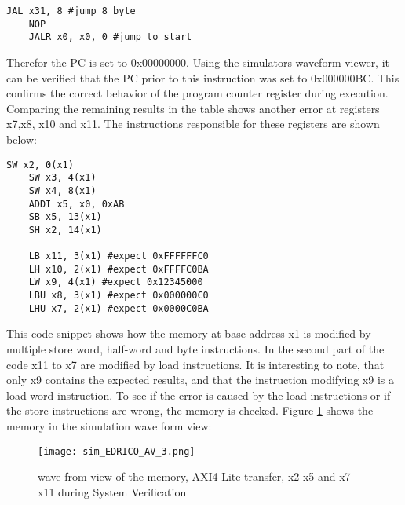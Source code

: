 \begin{lstlisting}[caption=Snippet 1 from the executed test code]
	JAL x31, 8 #jump 8 byte
	NOP
	JALR x0, x0, 0 #jump to start
\end{lstlisting}

Therefor the \ac{PC} is set to 0x00000000. Using the simulators waveform viewer, it can be verified that the \ac{PC} prior to this instruction was set to 0x000000BC. This confirms the correct behavior of the program counter register during execution.\\
Comparing the remaining results in the table shows another error at registers x7,x8, x10 and x11. The instructions responsible for these registers are shown below:

\begin{lstlisting}[caption=Snippet 2 from the executed test code]
	SW x2, 0(x1)
	SW x3, 4(x1)
	SW x4, 8(x1)
	ADDI x5, x0, 0xAB
	SB x5, 13(x1)
	SH x2, 14(x1)
	
	LB x11, 3(x1) #expect 0xFFFFFFC0
	LH x10, 2(x1) #expect 0xFFFFC0BA
	LW x9, 4(x1) #expect 0x12345000
	LBU x8, 3(x1) #expect 0x000000C0
	LHU x7, 2(x1) #expect 0x0000C0BA
\end{lstlisting}

This code snippet shows how the memory at base address x1 is modified by multiple store word, half-word and byte instructions.
In the second part of the code x11 to x7 are modified by load instructions. It is interesting to note, that only x9 contains the expected results, and that the instruction modifying x9 is a load word instruction. To see if the error is caused by the load instructions or if the store instructions are wrong, the memory is checked. Figure \ref{fig:SysVerWV} shows the memory in the simulation wave form view:

\begin{figure}[H]
	\centering
	\texttt{[image: sim\_EDRICO\_AV\_3.png]}
	\caption{wave from view of the memory, AXI4-Lite transfer, x2-x5 and x7-x11 during System Verification}
	\label{fig:SysVerWV}
\end{figure}

